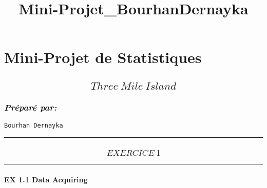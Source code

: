 \documentclass[11pt]{article}
\title{Mini-Projet\_BourhanDernayka}
\begin{document}
    
    
    \maketitle
    
    

    
    \section{Mini-Projet de Statistiques}\label{mini-projet-de-statistiques}

\subsection{\texorpdfstring{\[Three\ Mile\ Island \]}{Three\textbackslash{} Mile\textbackslash{} Island }}\label{three-mile-island}

\subsubsection{\texorpdfstring{\emph{Préparé
par:}}{Préparé par:}}\label{pruxe9paruxe9-par}

\begin{verbatim}
Bourhan Dernayka
\end{verbatim}

    \begin{center}\rule{0.5\linewidth}{\linethickness}\end{center}

\subsubsection{\texorpdfstring{\[EXERCICE\ 1\]}{EXERCICE\textbackslash{} 1}}\label{exercice-1}

    \begin{center}\rule{0.5\linewidth}{\linethickness}\end{center}

\paragraph{EX 1.1 Data Acquiring}\label{ex-1.1-data-acquiring}
\end{document}
